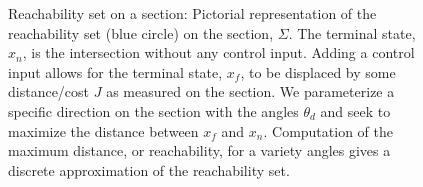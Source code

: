 \documentclass[smallcondensed]{svjour3}
\begin{document}
\begin{figure}
\begin{scaletikzpicturetowidth}{0.5\textwidth}
        \end{scaletikzpicturetowidth}
        \caption{Reachability set on a \Poincare section: Pictorial representation of the reachability set (blue circle) on the \Poincare section, \(\Sigma\). 
            The terminal state, \( x_n\), is the intersection without any control input. 
            Adding a control input allows for the terminal state, \( x_f \), to be displaced by some distance/cost \( J \) as measured on the section.
            We parameterize a specific direction on the section with the angles \( \theta_d\) and seek to maximize the distance between \( x_f \) and \( x_n \).
            Computation of the maximum distance, or reachability, for a variety angles gives a discrete approximation of the reachability set.\label{fig:reachability_set}}
\end{figure}
\end{document}
